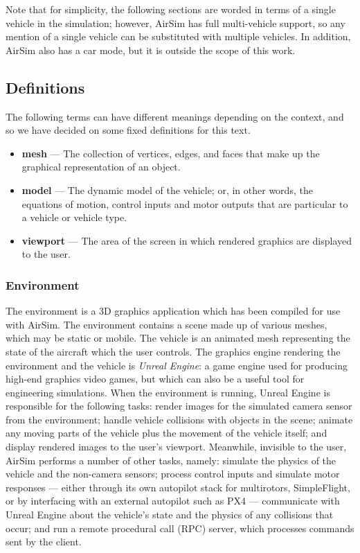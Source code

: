Note that for simplicity, the following sections are worded in terms of a single vehicle in the simulation; however, AirSim has full multi-vehicle support, so any mention of a single vehicle can be substituted with multiple vehicles. In addition, AirSim also has a car mode, but it is outside the scope of this work.

\subsection{Definitions}\label{sec:definitions}
The following terms can have different meanings depending on the context, and so we have decided on some fixed definitions for this text.

\begin{itemize}
    \item \textbf{mesh} --- The collection of vertices, edges, and faces that make up the graphical representation of an object.
    \item \textbf{model} --- The dynamic model of the vehicle; or, in other words, the equations of motion, control inputs and motor outputs that are particular to a vehicle or vehicle type.
    \item \textbf{viewport} --- The area of the screen in which rendered graphics are displayed to the user.
\end{itemize}


\subsubsection{Environment}
The environment is a 3D graphics application which has been compiled for use with AirSim. The environment contains a scene made up of various meshes, which may be static or mobile. The vehicle is an animated mesh representing the state of the aircraft which the user controls. The graphics engine rendering the environment and the vehicle is \textit{Unreal Engine}: a game engine used for producing high-end graphics video games, but which can also be a useful tool for engineering simulations. When the environment is running, Unreal Engine is responsible for the following tasks: render images for the simulated camera sensor from the environment; handle vehicle collisions with objects in the scene; animate any moving parts of the vehicle plus the movement of the vehicle itself; and display rendered images to the user's viewport. Meanwhile, invisible to the user, AirSim performs a number of other tasks, namely: simulate the physics of the vehicle and the non-camera sensors; process control inputs and simulate motor responses --- either through its own autopilot stack for multirotors, SimpleFlight, or by interfacing with an external autopilot such as PX4 --- communicate with Unreal Engine about the vehicle's state and the physics of any collisions that occur; and run a remote procedural call (RPC) server, which processes commands sent by the client.

